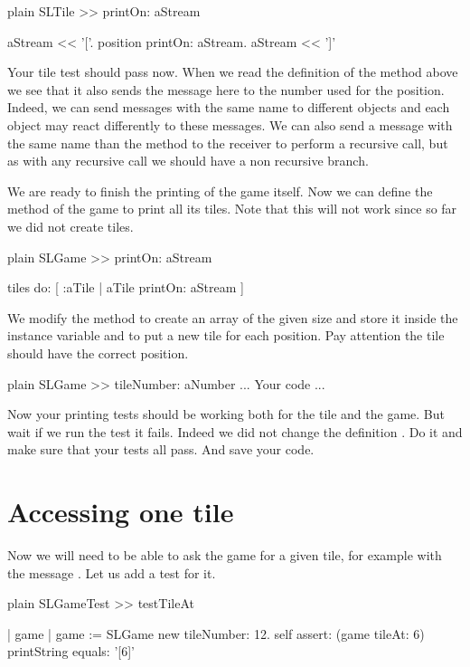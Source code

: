 \documentclass[10pt,twoside,english]{_support/latex/sbabook/sbabook}
\begin{document}
\begin{displaycode}{plain}
SLTile >> printOn: aStream

	aStream << '['.
	position printOn: aStream.
	aStream << ']'
\end{displaycode}

Your tile test should pass now. When we read the definition of the method  above we see that it also sends the message  here to  the number used for the position. Indeed, we can send messages with the same name to different objects and each object may react differently to these messages. We can also send a message with the same name than the method to the receiver to perform a recursive call, but as with any recursive call we should have a non recursive branch.

We are ready to finish the printing of the game itself.
Now we can define the method  of the game to print all its tiles.
Note that this will not work since so far we did not create tiles. 

\begin{displaycode}{plain}
SLGame >> printOn: aStream

	tiles do: [ :aTile | 
		aTile printOn: aStream ]
\end{displaycode}

We modify the method  to create an array of the given size and store it inside the  instance variable and to put a new tile for each position. Pay attention the tile should have the correct position.

\begin{displaycode}{plain}
SLGame >> tileNumber: aNumber
	... Your code ...
\end{displaycode}

Now your printing tests should be working both for the tile and the game. 
But wait if we run the test  it fails.
Indeed we did not change the definition .
Do it and make sure that your tests all pass. And save your code. 
\section{Accessing one tile}
Now we will need to be able to ask the game for a given tile, for example with the message . Let us add a test for it. 

\begin{displaycode}{plain}
SLGameTest >> testTileAt

	| game |
	game := SLGame new tileNumber: 12.
	self assert: (game tileAt: 6) printString equals: '[6]'
\end{displaycode}
\end{document}
